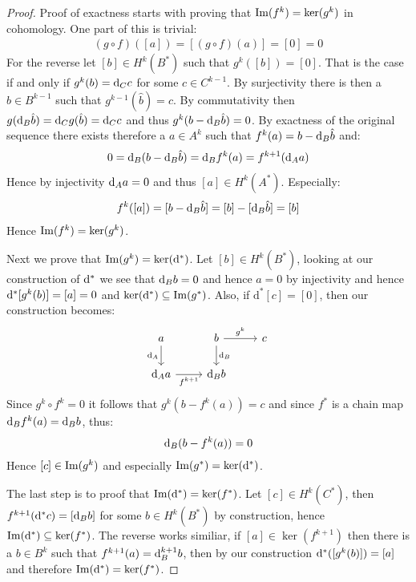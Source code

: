 \begin{proof}
Proof of exactness starts with proving that $\operatorname{Im}(f^k) = \ker(g^k)$ in cohomology. One part of
this is trivial:
\begin{align*}
	(g \circ f)([a]) = [(g \circ f)(a)] = [0] = 0
\end{align*}
For the reverse let $[b] \in H^k(B^*)$ such that $g^k([b]) = [0]$. That is the case if and only if
$g^k(b) = \mathrm{d}_C c$ for some $c \in C^{k - 1}$. By surjectivity there is then a
$\hat{b} \in B^{k - 1}$ such that $g^{k - 1}(\hat{b}) = c$. By commutativity then
$g(\mathrm{d}_B \hat{b}) = \mathrm{d}_C g(\hat{b}) = \mathrm{d}_C c$ and thus $g^k(b - \mathrm{d}_B \hat{b}) = 0$.
By exactness of the original sequence there exists therefore a $a \in A^k$ such that
$f^k(a) = b - \mathrm{d}_B \hat{b}$ and:
\begin{align*}
	0 = \mathrm{d}_B (b - \mathrm{d}_B \hat{b}) = \mathrm{d}_B f^k(a) = f^{k + 1}(\mathrm{d}_A a)
\end{align*}
Hence by injectivity $\mathrm{d}_A a = 0$ and thus $[a] \in H^k(A^*)$. Especially:
\begin{align*}
	f^k([a]) = [b - \mathrm{d}_B \hat{b}] = [b] - [\mathrm{d}_B \hat{b}] = [b]
\end{align*}
Hence $\operatorname{Im}(f^k) = \ker(g^k)$.

Next we prove that $\operatorname{Im}(g^k) = \ker(\mathrm{d}^*)$. Let $[b] \in H^k(B^*)$, looking at our
construction of $\mathrm{d}^*$ we see that $\mathrm{d}_B b = 0$ and hence $a = 0$ by injectivity
and hence $\mathrm{d}^* [g^k(b)] = [a] = 0$ and $\ker(\mathrm{d}^*) \subseteq \operatorname{Im}(g^*)$. Also, if $\mathrm{d}^* [c] = [0]$, then our
construction becomes:
\[\begin{tikzcd}
	a & b & c \\
	{\mathrm{d}_A a} & {\mathrm{d}_B b}
	\arrow["{\mathrm{d}_A}"', from=1-1, to=2-1]
	\arrow["{g^k}", from=1-2, to=1-3]
	\arrow["{\mathrm{d}_B}", from=1-2, to=2-2]
	\arrow["{f^{k + 1}}"', from=2-1, to=2-2]
\end{tikzcd}\]
Since $g^k \circ f^k = 0$ it follows that $g^k(b - f^k(a)) = c$ and since $f^*$ is a chain
map $\mathrm{d}_B f^k(a) = \mathrm{d}_B b$, thus:
\begin{align*}
\mathrm{d}_B(b - f^k(a)) = 0
\end{align*}
Hence $[c] \in \operatorname{Im}(g^k)$ and especially $\operatorname{Im}(g^*) = \ker (\mathrm{d}^*)$.

The last step is to proof that $\operatorname{Im}(\mathrm{d}^*) = \ker(f^*)$. Let $[c] \in H^k(C^*)$, then
$f^{k + 1}(\mathrm{d}^* c) = [\mathrm{d}_B b]$ for some $b \in H^k(B^*)$ by construction, hence
$\operatorname{Im}(\mathrm{d}^*) \subseteq \ker(f^*)$. The reverse works similiar, if
$[a] \in \ker(f^{k + 1})$ then there is a $b \in B^k$ such that
$f^{k + 1}(a) = \mathrm{d}_B^{k + 1}b$, then by our construction $\mathrm{d}^*([g^{k}(b)]) = [a]$ and
therefore $\operatorname{Im}(\mathrm{d}^*) = \ker(f^*)$.
\end{proof}

